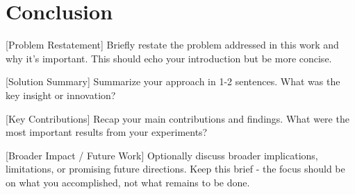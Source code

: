 
\section{Conclusion}
\label{sec:conclusion}

[Problem Restatement] Briefly restate the problem addressed in this work and why it's important. This should echo your introduction but be more concise.

[Solution Summary] Summarize your approach in 1-2 sentences. What was the key insight or innovation?

[Key Contributions] Recap your main contributions and findings. What were the most important results from your experiments?

[Broader Impact / Future Work] Optionally discuss broader implications, limitations, or promising future directions. Keep this brief - the focus should be on what you accomplished, not what remains to be done.


